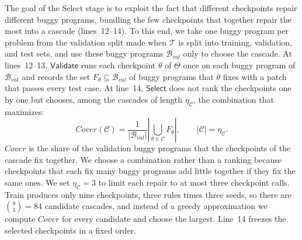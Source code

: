 \documentclass[conference]{IEEEtran}
\begin{document}
The goal of the Select stage is to exploit the fact that different checkpoints repair different buggy programs, bundling the few checkpoints that together repair the most into a cascade (lines~12--14). To this end, we take one buggy program per problem from the validation split made when \(\mathcal T\) is split into training, validation, and test sets, and use these buggy programs \(\mathcal B_{\mathit{val}}\) only to choose the cascade. At lines~12--13, \(\mathsf{Validate}\) runs each checkpoint \(\theta\) of \(\Theta\) once on each buggy program of \(\mathcal B_{\mathit{val}}\) and records the set \(F_\theta\subseteq\mathcal B_{\mathit{val}}\) of buggy programs that \(\theta\) fixes with a patch that passes every test case. At line~14, \(\mathsf{Select}\) does not rank the checkpoints one by one but chooses, among the cascades of length \(\eta_{\mathcal C}\), the combination that maximizes:
\[
 \mathit{Cover}(\mathcal C)=\frac{1}{|\mathcal B_{\mathit{val}}|}\left|\bigcup_{\theta\in\mathcal C} F_\theta\right|,\qquad |\mathcal C|=\eta_{\mathcal C}.
\]
\(\mathit{Cover}\) is the share of the validation buggy programs that the checkpoints of the cascade fix together. We choose a combination rather than a ranking because checkpoints that each fix many buggy programs add little together if they fix the same ones. We set \(\eta_{\mathcal C}=3\) to limit each repair to at most three checkpoint calls. Train produces only nine checkpoints, three rules times three seeds, so there are \(\binom{9}{3}=84\) candidate cascades, and instead of a greedy approximation we compute \(\mathit{Cover}\) for every candidate and choose the largest. Line~14 freezes the selected checkpoints in a fixed order.
\end{document}
